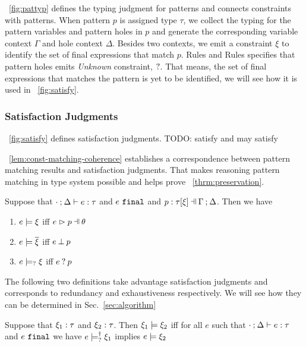 \documentclass[runningheads,envcountsame,a4paper]{llncs}
\newcommand{\todo}[1]{{\color{red} TODO: #1}}
\begin{document}
\figurename~\ref{fig:pattyp} defines the typing judgment for patterns and
connects constraints with patterns. When pattern $p$ is assigned type $\tau$,
we collect the typing for the pattern variables and pattern holes in $p$ and
generate the corresponding variable context $\Gamma$ and hole context $\Delta$.
Besides two contexts, we emit a constraint $\xi$ to identify the set of final
expressions that match $p$. Rules \PTEHole and Rules \PTHole specifies that
pattern holes emits \textit{Unknown} constraint, $\mathtt{?}$. That means, the
set of final expressions that matches the pattern is yet to be identified, we
will see how it is used in \figurename~\ref{fig:satisfy}.

\subsubsection{Satisfaction Judgments}


\figurename~\ref{fig:satisfy} defines satisfaction judgments.
\todo{satisfy and may satisfy}

\lemmaname~\ref{lem:const-matching-coherence} establishes a correspondence
between pattern matching results and satisfaction judgments. That makes
reasoning pattern matching in type system possible and helps prove
\theoremname~\ref{thrm:preservation}.

\begin{lemma}
  \label{lem:const-matching-coherence}
  Suppose that $\cdot \mathbin{;} \Delta \vdash e : \tau$ and $e ~\mathtt{final}$ and $\chpattyp{p}{\tau}{\xi}{\Gamma}{\Delta}$. Then we have
  \begin{enumerate}
  \item $e \models \xi$ iff $\hpatmatch{e}{p}{\theta}$
  \item $e \models \overline{\xi}$ iff $e \mathbin{\bot} p$
  \item $e \models_{?} \xi$ iff $e \mathbin{?} p$
  \end{enumerate}
\end{lemma}

The following two definitions take advantage satisfaction judgments and
corresponds to redundancy and exhaustiveness respectively. We will see how they
can be determined in Sec.~\ref{sec:algorithm}

\begin{definition}
  \label{defn:const-entailment}
  Suppose that $\xi_1 : \tau$ and $\xi_2 : \tau$.
  Then $\xi_1 \models \xi_2$ iff for all $e$ such that $\cdot \mathbin{;} \Delta \vdash e : \tau$ and $e ~\mathtt{final}$ we have $e \models_{?}^{\dag} \xi_1$ implies $e \models \xi_2$
\end{definition}
\end{document}
